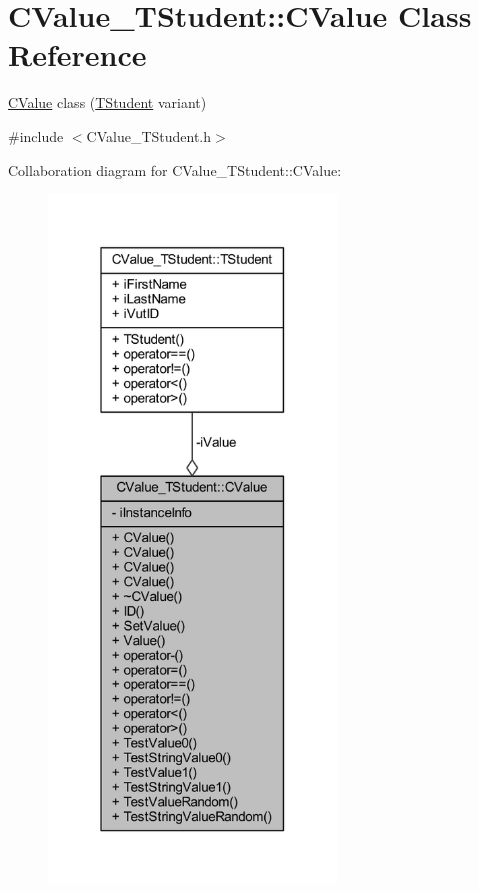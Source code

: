 \hypertarget{class_c_value___t_student_1_1_c_value}{}\section{C\+Value\+\_\+\+T\+Student\+:\+:C\+Value Class Reference}
\label{class_c_value___t_student_1_1_c_value}


\hyperlink{class_c_value___t_student_1_1_c_value}{C\+Value} class ({\ttfamily \hyperlink{struct_c_value___t_student_1_1_t_student}{T\+Student}} variant)  




{\ttfamily \#include $<$C\+Value\+\_\+\+T\+Student.\+h$>$}



Collaboration diagram for C\+Value\+\_\+\+T\+Student\+:\+:C\+Value\+:\nopagebreak
\begin{figure}[H]
\begin{center}
\leavevmode
\includegraphics[width=217pt]{class_c_value___t_student_1_1_c_value__coll__graph}
\end{center}
\end{figure}
